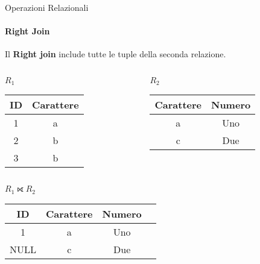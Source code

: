     \begin{frame}{Operazioni Relazionali}
        \framesubtitle{Right Join}
        Il \textbf{Right join} include tutte le tuple della seconda relazione.
        \begin{columns}
            \begin{column}{0.48\textwidth}
                \centering
                {\small $R_1$}
                \newline
        \begin{tabular}{|c|c|}
            \hline
            \rowcolor{cyan!30}ID & Carattere \\
            \hline
            1 & a \\ \hline
            2 & \cellcolor{red}b \\ \hline
            3 & \cellcolor{red}b \\ \hline
            \end{tabular}
            \end{column}
            \begin{column}{0.48\textwidth}
                \centering
                {\small $R_2$}
                \newline
                \begin{tabular}{|c|c|}
                    \hline
                    \rowcolor{cyan!30} Carattere & Numero \\ \hline
                    a & Uno \\ \hline
                    \cellcolor{green}c & Due \\ \hline
                    \end{tabular}
            \end{column}
        \end{columns}
        \vspace{.5cm}
        \centering
        \pause
        {\small $R_1 \rightouterjoin R_2$}
        \begin{tabular}{|c|c|c|c|}
            \hline
            \rowcolor{cyan!30} ID & Carattere & Numero \\ \hline
            1 & a & Uno \\ \hline
            NULL & c & Due \\ \hline
            \end{tabular}
    \end{frame}
